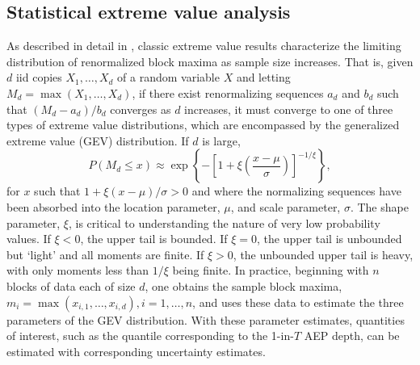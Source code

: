 \documentclass{ametsocV6.1}
\begin{document}
\subsection*{Statistical extreme value analysis}
\label{app:eva}

As described in detail in \citet{coles2001introduction}, classic extreme value results characterize the limiting distribution of renormalized block maxima as sample size increases.
That is, given $d$ iid copies $X_{1}, \ldots, X_{d}$ of a random variable $X$ and letting $M_d = \max(X_1, \ldots, X_d)$, if there exist renormalizing sequences $a_d$ and $b_d$ such that $(M_d - a_d)/b_d$ converges as $d$ increases, it must converge to one of three types of extreme value distributions, which are encompassed by the generalized extreme value (GEV) distribution.
If $d$ is large, 
\begin{equation}
\label{eq:GEV}
P(M_d \leq x) \approx \exp
  \left\{ - \left[1 + \xi \left(\frac{x - \mu}{\sigma}\right) \right]^{-1/\xi} \right\},
\end{equation}
for $x$ such that $1 + \xi (x - \mu)/{\sigma} > 0$ and where the normalizing sequences have been absorbed into the location parameter, $\mu$, and scale parameter, $\sigma$. 
The shape parameter, $\xi$, is critical to understanding the nature of very low probability values.
If $\xi <0$, the upper tail is bounded. %
If $\xi = 0$, the upper tail is unbounded but `light' and all moments are finite.
If $\xi > 0$, the unbounded upper tail is heavy, with only moments less than $1/\xi$ being finite.
In practice, beginning with $n$ blocks of data each of size $d$,  one obtains the sample block maxima, $m_i = \max(x_{i,1}, \ldots, x_{i,d}), i = 1, \ldots, n$, and uses these data to estimate the three parameters of the GEV distribution.
With these parameter estimates, quantities of interest, such as the quantile corresponding to the 1-in-$T$ AEP depth, can be estimated with corresponding uncertainty estimates.
\end{document}
